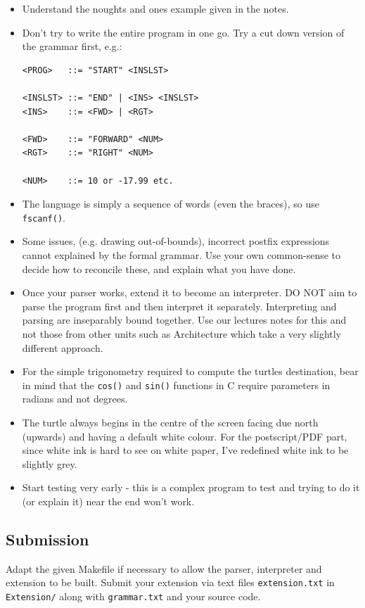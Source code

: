 \begin{exercise}
\begin{itemize}
\item Understand the noughts and ones example given in the notes.

\item Don't try to write the entire program in one go. Try a cut
down version of the grammar first, e.g.:
{\small
\begin{verbatim}
<PROG>   ::= "START" <INSLST>

<INSLST> ::= "END" | <INS> <INSLST>
<INS>    ::= <FWD> | <RGT>

<FWD>    ::= "FORWARD" <NUM>
<RGT>    ::= "RIGHT" <NUM>

<NUM>    ::= 10 or -17.99 etc.
\end{verbatim}
}

\item The language is simply a sequence of words (even the braces),
so use \verb^fscanf()^.

\item Some issues, (e.g. drawing out-of-bounds), incorrect postfix
expressions cannot explained by the formal grammar. Use your own
common-sense to decide how to reconcile these, and explain what you
have done.

\item Once your parser works, extend it to become an interpreter. DO
NOT aim to parse the program first and then interpret it
separately. Interpreting and parsing are inseparably bound together. Use
our lectures notes for this and not those from other units such as
Architecture which take a very slightly different approach.

\item For the simple trigonometry required to compute the turtles
destination, bear in mind that the \verb^cos()^ and \verb^sin()^ functions
in C require parameters in radians and not degrees.

\item The turtle always begins in the centre of the screen facing due
north (upwards) and having a default white colour.  For the postscript/PDF
part, since white ink is hard to see on white paper, I've redefined
white ink to be slightly grey.

\item Start testing very early - this is a complex program to test and
trying to do it (or explain it) near the end won't work.

\end{itemize}

\subsection*{Submission}
Adapt the given Makefile if necessary to allow the parser, interpreter and extension to 
be built.
Submit your extension via text files \verb^extension.txt^ in \verb^Extension/^ along with  \verb^grammar.txt^ and your source code.


\end{exercise}
